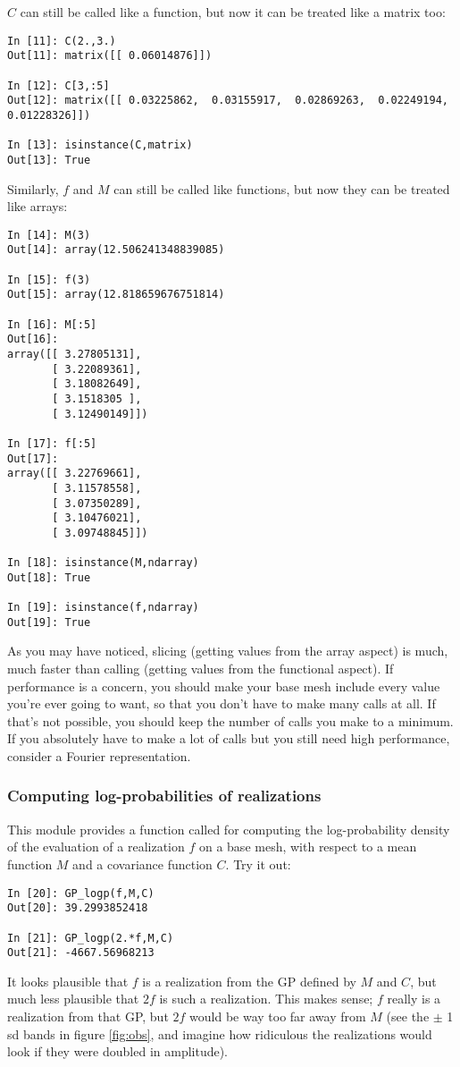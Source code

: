 \documentclass{manual}
\begin{document}
$C$ can still be called like a function, but now it can be treated like a matrix too:
\begin{verbatim}
In [11]: C(2.,3.)
Out[11]: matrix([[ 0.06014876]])

In [12]: C[3,:5]
Out[12]: matrix([[ 0.03225862,  0.03155917,  0.02869263,  0.02249194,  0.01228326]])

In [13]: isinstance(C,matrix)
Out[13]: True
\end{verbatim}
Similarly, $f$ and $M$ can still be called like functions, but now they can be treated like arrays:
\begin{verbatim}
In [14]: M(3)
Out[14]: array(12.506241348839085)

In [15]: f(3)
Out[15]: array(12.818659676751814)

In [16]: M[:5]
Out[16]: 
array([[ 3.27805131],
       [ 3.22089361],
       [ 3.18082649],
       [ 3.1518305 ],
       [ 3.12490149]])

In [17]: f[:5]
Out[17]: 
array([[ 3.22769661],
       [ 3.11578558],
       [ 3.07350289],
       [ 3.10476021],
       [ 3.09748845]])

In [18]: isinstance(M,ndarray)
Out[18]: True

In [19]: isinstance(f,ndarray)
Out[19]: True
\end{verbatim}


As you may have noticed, slicing (getting values from the array aspect) is much, much faster than calling (getting values from the functional aspect). If performance is a concern, you should make your base mesh include every value you're ever going to want, so that you don't have to make many calls at all. If that's not possible, you should keep the number of calls you make to a minimum. If you absolutely have to make a lot of calls but you still need high performance, consider a Fourier representation.
 
\subsubsection{Computing log-probabilities of realizations}\label{subsub:logp}
This module provides a function called  for computing the log-probability density of the evaluation of a realization $f$ on a base mesh, with respect to a mean function $M$ and a covariance function $C$. Try it out:
\begin{verbatim}
In [20]: GP_logp(f,M,C)
Out[20]: 39.2993852418

In [21]: GP_logp(2.*f,M,C)
Out[21]: -4667.56968213
\end{verbatim}
It looks plausible that $f$ is a realization from the GP defined by $M$ and $C$, but much less plausible that $2f$ is such a realization. This makes sense; $f$ really is a realization from that GP, but $2f$ would be way too far away from $M$ (see the $\pm$ 1 sd bands in figure \ref{fig:obs}, and imagine how ridiculous the realizations would look if they were doubled in amplitude).
\end{document}
